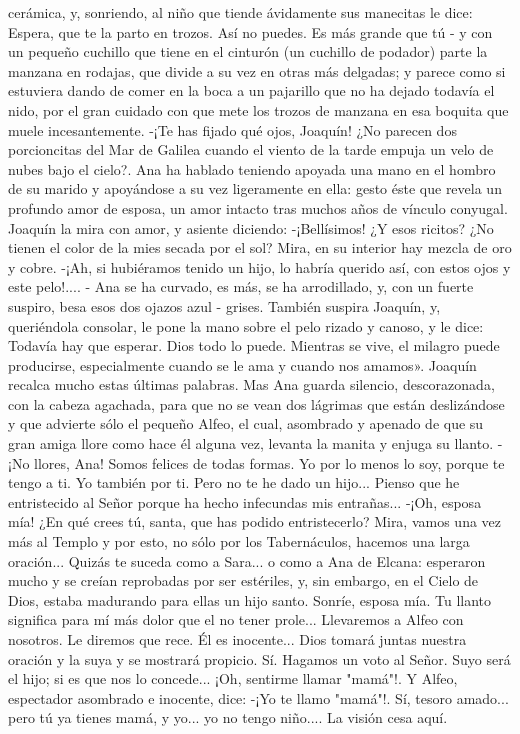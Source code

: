\documentclass[12pt]{book} %
\begin{document}
cerámica, y, sonriendo, al niño que tiende ávidamente sus manecitas le dice: 
Espera, que te la parto en trozos. Así no puedes. Es más grande que tú - y con un pequeño cuchillo que tiene en el cinturón (un cuchillo de podador) parte la manzana en rodajas, que divide a su vez en otras más delgadas; y parece como si estuviera dando de comer en la boca a un pajarillo que no ha dejado todavía el nido, por el gran cuidado con que mete los trozos de manzana en esa boquita que muele incesantemente. 
-¡Te has fijado qué ojos, Joaquín! ¿No parecen dos porcioncitas del Mar de Galilea cuando el viento de la tarde empuja 
un velo de nubes bajo el cielo?. 
Ana ha hablado teniendo apoyada una mano en el hombro de su marido y apoyándose a su vez ligeramente en ella: gesto éste que revela un profundo amor de esposa, un amor intacto tras muchos años de vínculo conyugal. 
Joaquín la mira con amor, y asiente diciendo: 
-¡Bellísimos! ¿Y esos ricitos? ¿No tienen el color de la mies secada por el sol? Mira, en su interior hay mezcla de oro y 
cobre. 
-¡Ah, si hubiéramos tenido un hijo, lo habría querido así, con estos ojos y este pelo!.... - Ana se ha curvado, es más, se 
ha arrodillado, y, con un fuerte suspiro, besa esos dos ojazos azul - grises. 
También suspira Joaquín, y, queriéndola consolar, le pone la mano sobre el pelo rizado y canoso, y le dice: 
Todavía hay que esperar. Dios todo lo puede. Mientras se vive, el milagro puede producirse, especialmente cuando se le ama y cuando nos amamos». Joaquín recalca mucho estas últimas palabras. 
Mas Ana guarda silencio, descorazonada, con la cabeza agachada, para que no se vean dos lágrimas que están deslizándose y que advierte sólo el pequeño Alfeo, el cual, asombrado y apenado de que su gran amiga llore como hace él alguna vez, levanta la manita y enjuga su llanto. 
-¡No llores, Ana! Somos felices de todas formas. Yo por lo menos lo soy, porque te tengo a ti. 
Yo también por ti. Pero no te he dado un hijo... Pienso que he entristecido al Señor porque ha hecho infecundas mis 
entrañas... 
-¡Oh, esposa mía! ¿En qué crees tú, santa, que has podido entristecerlo? Mira, vamos una vez más al Templo y por esto, no sólo por los Tabernáculos, hacemos una larga oración... Quizás te suceda como a Sara... o como a Ana de Elcana: esperaron mucho y se creían reprobadas por ser estériles, y, sin embargo, en el Cielo de Dios, estaba madurando para ellas un hijo santo. Sonríe, esposa mía. Tu llanto significa para mí más dolor que el no tener prole... Llevaremos a Alfeo con nosotros. Le diremos que rece. Él es inocente... Dios tomará juntas nuestra oración y la suya y se mostrará propicio. 
Sí. Hagamos un voto al Señor. Suyo será el hijo; si es que nos lo concede... ¡Oh, sentirme llamar "mamá"!. Y Alfeo, espectador asombrado e inocente, dice: 
-¡Yo te llamo "mamá"!. 
Sí, tesoro amado... pero tú ya tienes mamá, y yo... yo no tengo niño.... La visión cesa aquí. 
\end{document}
